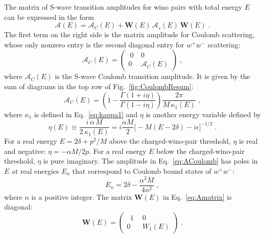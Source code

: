 \documentclass[%
 reprint,
 amsmath,amssymb,
 aps,
]{revtex4-1}
\begin{document}
The matrix of S-wave transition amplitudes for wino pairs with total energy $E$ can be expressed in the form
\begin{equation}
\label{eq:Amatrix}
\bm{\mathcal{A}}(E) =
\bm{\mathcal{A}}_C(E) + \bm{W}(E) \,\bm{\mathcal{A}}_s(E)\, \bm{W}(E) \;.
\end{equation}
The first term on the right side is the matrix amplitude for Coulomb scattering, whose only nonzero entry is the second diagonal entry for $w^+ w^-$ scattering:
\begin{equation}
\label{eq:ACmatrix}
\bm{\mathcal{A}}_C(E) =
\begin{pmatrix} ~0~  & 0  \\  0  & \mathcal{A}_C(E) \end{pmatrix} \;,
\end{equation}
where $\mathcal{A}_C(E)$ is the S-wave Coulomb transition amplitude. 
It is given by the sum of diagrams in the top row of Fig.~\ref{fig:CoulombResum}:
\begin{equation}
\label{eq:ACoulomb}
\mathcal{A}_C(E) = 
\left( 1 - \frac{\Gamma(1+i \eta)}{\Gamma(1-i \eta)}  \right) \frac{2\pi}{M\, \kappa_1(E)} \;,
\end{equation}
where $\kappa_1$ is defined in Eq.~\eqref{eq:kappa1} and $\eta$ is another energy variable defined by
\begin{equation}
\label{eq:eta-def}
\eta(E) \equiv 
 \frac{i\, \alpha \, M}{2\, \kappa_1(E)} 
 = i \frac{\alpha M}{2} \big[ - M(E-2 \delta) - i \epsilon \big]^{-1/2} \;.
\end{equation}
For a real energy $E = 2 \delta + p^2/M$ above the charged-wino-pair threshold, $\eta$ is real and negative: $\eta = - \alpha M/2p$.
For a real energy $E$ below the charged-wino-pair threshold, $\eta$ is pure imaginary.
The amplitude in Eq.~\eqref{eq:ACoulomb} has poles in $E$  at real energies $E_n$ that correspond to Coulomb bound states of $w^+ w^-$: 
\begin{equation}
\label{eq:E-n}
E_n = 2 \delta
- \frac{ \alpha^2 M}{4 n^2} \;,
\end{equation}
where $n$ is a positive integer. 
The matrix $\bm{W}(E)$ in Eq.~\eqref{eq:Amatrix} is diagonal:
\begin{equation}
\label{eq:Wmatrix}
\bm{W}(E)= 
\begin{pmatrix} ~~1~~   & 0 \\  0 & W_1(E) \end{pmatrix} \;.
\end{equation}
\end{document}
